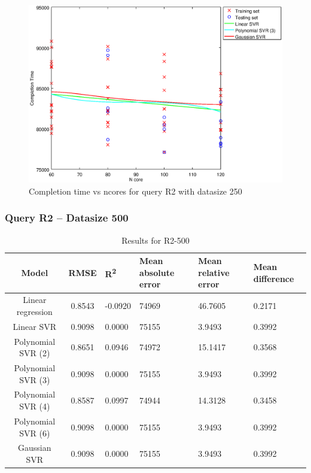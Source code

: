 \documentclass[a4paper,11pt]{article}
\begin{document}
\begin {figure}[hbtp]
\centering
\includegraphics[width=\textwidth]{output/R2_250_ONLY_1_LINEAR_NCORE/plot_R2_250_bestmodels.eps}
\caption{Completion time vs ncores for query R2 with datasize 250}
\label{fig:coreonly_linear_R2_250}
\end {figure}

\newpage
\subsubsection{Query R2 -- Datasize 500}
\begin{table}[H]
	\centering
	\begin{adjustbox}{center}
		\begin{tabular}{c | c M{1.2cm} M{2.5cm} M{2.5cm} M{1.8cm}}
			Model & RMSE & R\textsuperscript{2} & Mean absolute error & Mean relative error & Mean difference \tabularnewline
			\hline
			Linear regression & 0.8543 & -0.0920 &  74969 & 46.7605 & 0.2171 \\
			Linear SVR & 0.9098 & 0.0000 &  75155 & 3.9493 & 0.3992 \\
			Polynomial SVR (2) & 0.8651 & 0.0946 &  74972 & 15.1417 & 0.3568 \\
			Polynomial SVR (3) & 0.9098 & 0.0000 &  75155 & 3.9493 & 0.3992 \\
			Polynomial SVR (4) & 0.8587 & 0.0997 &  74944 & 14.3128 & 0.3458 \\
			Polynomial SVR (6) & 0.9098 & 0.0000 &  75155 & 3.9493 & 0.3992 \\
			Gaussian SVR & 0.9098 & 0.0000 &  75155 & 3.9493 & 0.3992 \\
		\end{tabular}
	\end{adjustbox}
	\\
	\caption{Results for R2-500}
	\label{fig:coreonly_linear_R2_500}
\end{table}
\end{document}
